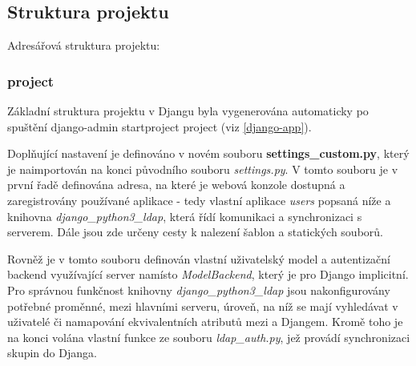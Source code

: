 \subsection{Struktura projektu}
Adresářová struktura projektu:

\subsubsection{project}
Základní struktura projektu v Djangu byla vygenerována automaticky po
spuštění \textsf{django-admin startproject project} (viz
\ref{django-app}).

Doplňující nastavení je definováno v novém souboru
\textbf{settings\_custom.py}, který je naimportován na konci původního
souboru \textit{settings.py}. V tomto souboru je v první řadě
definována  adresa, na které je webová konzole dostupná a
zaregistrovány používané aplikace - tedy vlastní aplikace
\textit{users} popsaná níže a knihovna \textit{django\_python3\_ldap},
která řídí komunikaci a synchronizaci s  serverem. Dále jsou
zde určeny cesty k nalezení šablon a statických souborů.

Rovněž je v tomto souboru definován vlastní uživatelský model a
autentizační backend využívající  server namísto
\textit{ModelBackend}, který je pro Django implicitní. Pro správnou
funkčnost knihovny \textit{django\_python3\_ldap} jsou nakonfigurovány
potřebné proměnné, mezi hlavními   serveru, úroveň,
na níž se mají vyhledávat v  uživatelé či namapování
ekvivalentních atributů mezi  a Djangem. Kromě toho je na
konci volána vlastní funkce ze souboru \textit{ldap\_auth.py}, jež
provádí synchronizaci skupin do Djanga.

